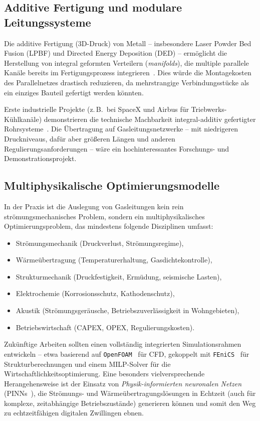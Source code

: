 ﻿\documentclass[12pt,a4paper,twoside]{article}
\theoremstyle{plain}
\theoremstyle{definition}
\theoremstyle{remark}
\begin{document}
\subsection{Additive Fertigung und modulare Leitungssysteme}
\label{ssec:ausblick_3d}

Die additive Fertigung (3D-Druck) von Metall -- insbesondere Laser Powder Bed Fusion
(LPBF) und Directed Energy Deposition (DED) -- ermöglicht die Herstellung von
integral geformten Verteilern (\textit{manifolds}), die multiple parallele
Kanäle bereits im Fertigungsprozess integrieren~\cite{Thompson2016}.
Dies würde die Montagekosten des Parallelnetzes drastisch reduzieren, da
mehrstrangige Verbindungsstücke als ein einziges Bauteil gefertigt werden könnten.

Erste industrielle Projekte (z.\,B.\ bei SpaceX und Airbus für Triebwerks-Kühlkanäle)
demonstrieren die technische Machbarkeit integral-additiv gefertigter
Rohrsysteme~\cite{Gradl2021}.
Die Übertragung auf Gasleitungsnetzwerke -- mit niedrigeren Druckniveaus, dafür
aber größeren Längen und anderen Regulierungsanforderungen -- wäre ein
hochinteressantes Forschungs- und Demonstrationsprojekt.

\subsection{Multiphysikalische Optimierungsmodelle}
\label{ssec:ausblick_multi}

In der Praxis ist die Auslegung von Gasleitungen kein rein strömungsmechanisches
Problem, sondern ein multiphysikalisches Optimierungsproblem, das mindestens
folgende Disziplinen umfasst:
\begin{itemize}
  \item Strömungsmechanik (Druckverlust, Strömungsregime),
  \item Wärmeübertragung (Temperaturerhaltung, Gasdichtekontrolle),
  \item Strukturmechanik (Druckfestigkeit, Ermüdung, seismische Lasten),
  \item Elektrochemie (Korrosionsschutz, Kathodenschutz),
  \item Akustik (Strömungsgeräusche, Betriebszuverlässigkeit in Wohngebieten),
  \item Betriebswirtschaft (CAPEX, OPEX, Regulierungskosten).
\end{itemize}
Zukünftige Arbeiten sollten einen vollständig integrierten Simulationsrahmen
entwickeln -- etwa basierend auf \texttt{OpenFOAM}~\cite{Jasak2007} für CFD,
gekoppelt mit \texttt{FEniCS}~\cite{AlnaesEtal2015} für Strukturberechnungen
und einem MILP-Solver für die Wirtschaftlichkeitsoptimierung.
Eine besonders vielversprechende Herangehensweise ist der Einsatz von
\emph{Physik-informierten neuronalen Netzen} (PINNs~\cite{Raissi2019}), die
Strömungs- und Wärmeübertragungslösungen in Echtzeit (auch für komplexe,
zeitabhängige Betriebszustände) generieren können und somit den Weg zu
echtzeitfähigen digitalen Zwillingen ebnen.
\end{document}
